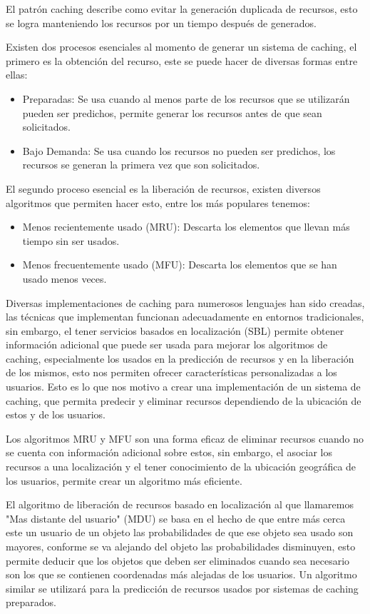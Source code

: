 \documentclass[12pt,a4paper,spanish,openany]{book}
\begin{document}
El patrón caching describe como evitar la generación duplicada de recursos, esto
se logra manteniendo los recursos por un tiempo después de generados.


Existen dos procesos esenciales al momento de generar un sistema de caching, el
primero es la obtención del recurso, este se puede hacer de diversas formas
entre ellas:
\begin{itemize}
  \item Preparadas: Se usa cuando al menos parte de los recursos que se
  utilizarán pueden ser predichos, permite generar los recursos antes de que
  sean solicitados.
  \item Bajo Demanda: Se usa cuando los recursos no pueden ser predichos, los
  recursos se generan la primera vez que son solicitados.
\end{itemize}
El segundo proceso esencial es la liberación de recursos, existen diversos
algoritmos que permiten hacer esto, entre los más populares tenemos:
\begin{itemize}
  \item Menos recientemente usado (MRU): Descarta los elementos que llevan más
  tiempo sin ser usados.
  \item Menos frecuentemente usado (MFU): Descarta los elementos que se han
  usado menos veces.
\end{itemize}


Diversas implementaciones de caching para numerosos lenguajes han sido
creadas, las técnicas que implementan
funcionan adecuadamente en entornos tradicionales, sin embargo, el tener
servicios basados en localización (SBL) permite obtener información adicional
que puede ser usada para mejorar los algoritmos de caching, especialmente los usados
en la predicción de recursos y en la liberación de los mismos, esto nos permiten
ofrecer características personalizadas a los usuarios. Esto es lo que nos
motivo a crear una implementación de un sistema de caching, que permita predecir
y eliminar recursos dependiendo de la ubicación de estos y de los usuarios.


Los algoritmos MRU y MFU son una forma eficaz de eliminar recursos cuando no
se cuenta con información adicional sobre estos, sin embargo, el
asociar los recursos a una localización y el tener conocimiento de la ubicación
geográfica de los usuarios, permite crear un algoritmo más eficiente. 

El
algoritmo de liberación de recursos basado en localización al que llamaremos
"Mas distante del usuario" (MDU) se basa en el hecho de que entre más cerca este
un usuario de un objeto las probabilidades de que ese objeto sea usado son
mayores, conforme se va alejando del objeto las probabilidades disminuyen, esto
permite deducir que los objetos que deben ser eliminados cuando sea necesario
son los que se contienen coordenadas más alejadas de los usuarios.
Un algoritmo similar se utilizará para la predicción de recursos usados por
sistemas de caching preparados.
\end{document}
